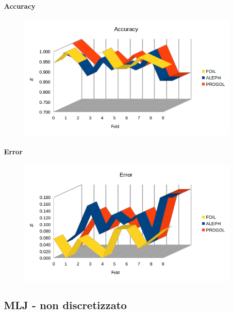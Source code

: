 \paragraph{Accuracy}
\begin{figure}[h!tbp]
	\includegraphics[width=1.2\textwidth]{img/datasetGraph/mlj/discr/accuracy.png}
	\label{mljdiscr-Accuracy}
\end{figure}
\paragraph{Error}
\begin{figure}[h!tbp]
	\includegraphics[width=1.2\textwidth]{img/datasetGraph/mlj/discr/error.png}
	\label{mljdiscr-Error}
\end{figure}

\subsection{MLJ - non discretizzato}
